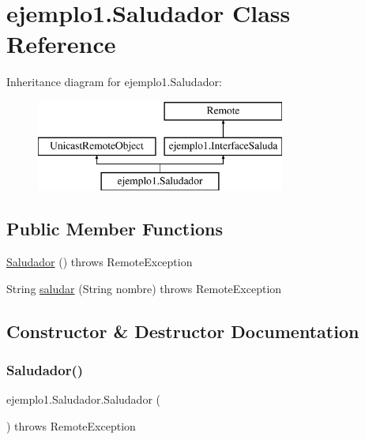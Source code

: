 \hypertarget{classejemplo1_1_1_saludador}{}\section{ejemplo1.\+Saludador Class Reference}
\label{classejemplo1_1_1_saludador}
Inheritance diagram for ejemplo1.\+Saludador\+:\begin{figure}[H]
\begin{center}
\leavevmode
\includegraphics[height=3.000000cm]{classejemplo1_1_1_saludador}
\end{center}
\end{figure}
\subsection*{Public Member Functions}
\begin{DoxyCompactItemize}
\item 
\mbox{\hyperlink{classejemplo1_1_1_saludador_a148dafbf3870eae8644371d9bdce76c1}{Saludador}} ()  throws Remote\+Exception 
\item 
String \mbox{\hyperlink{classejemplo1_1_1_saludador_accec00f9fe8215cabc7a9a8c8016c538}{saludar}} (String nombre)  throws Remote\+Exception       
\end{DoxyCompactItemize}


\subsection{Constructor \& Destructor Documentation}
\mbox{\label{classejemplo1_1_1_saludador_a148dafbf3870eae8644371d9bdce76c1}} 
\subsubsection{\texorpdfstring{Saludador()}{Saludador()}}
{\footnotesize\ttfamily ejemplo1.\+Saludador.\+Saludador (\begin{DoxyParamCaption}{ }\end{DoxyParamCaption}) throws Remote\+Exception\hspace{0.3cm}{\ttfamily [inline]}}



